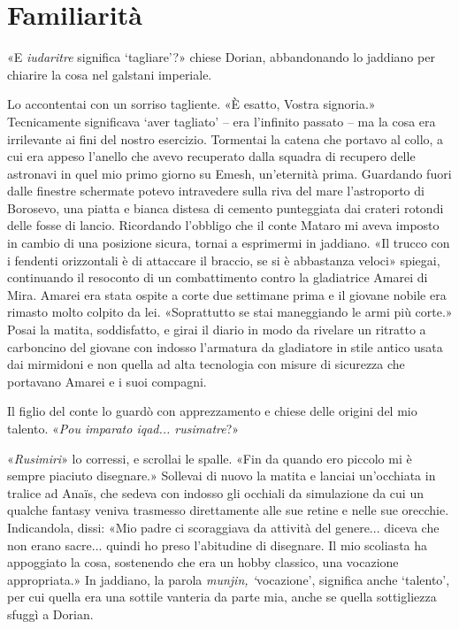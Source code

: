 \chapter{Familiarità}

«E \emph{iudaritre} significa `tagliare'?» chiese Dorian, abbandonando
lo jaddiano per chiarire la cosa nel galstani imperiale.

Lo accontentai con un sorriso tagliente. «È esatto, Vostra signoria.»
Tecnicamente significava `aver tagliato' -- era l'infinito passato -- ma
la cosa era irrilevante ai fini del nostro esercizio. Tormentai la
catena che portavo al collo, a cui era appeso l'anello che avevo
recuperato dalla squadra di recupero delle astronavi in quel mio primo
giorno su Emesh, un'eternità prima. Guardando fuori dalle finestre
schermate potevo intravedere sulla riva del mare l'astroporto di
Borosevo, una piatta e bianca distesa di cemento punteggiata dai crateri
rotondi delle fosse di lancio. Ricordando l'obbligo che il conte Mataro
mi aveva imposto in cambio di una posizione sicura, tornai a esprimermi
in jaddiano. «Il trucco con i fendenti orizzontali è di attaccare il
braccio, se si è abbastanza veloci» spiegai, continuando il resoconto di
un combattimento contro la gladiatrice Amarei di Mira. Amarei era stata
ospite a corte due settimane prima e il giovane nobile era rimasto molto
colpito da lei. «Soprattutto se stai maneggiando le armi più corte.»
Posai la matita, soddisfatto, e girai il diario in modo da rivelare un
ritratto a carboncino del giovane con indosso l'armatura da gladiatore
in stile antico usata dai mirmidoni e non quella ad alta tecnologia con
misure di sicurezza che portavano Amarei e i suoi compagni.

Il figlio del conte lo guardò con apprezzamento e chiese delle origini
del mio talento. «\emph{Pou imparato iqad... rusimatre}?»

«\emph{Rusimiri}» lo corressi, e scrollai le spalle. «Fin da quando ero
piccolo mi è sempre piaciuto disegnare.» Sollevai di nuovo la matita e
lanciai un'occhiata in tralice ad Anaïs, che sedeva con indosso gli
occhiali da simulazione da cui un qualche fantasy veniva trasmesso
direttamente alle sue retine e nelle sue orecchie. Indicandola, dissi:
«Mio padre ci scoraggiava da attività del genere... diceva che non erano
sacre... quindi ho preso l'abitudine di disegnare. Il mio scoliasta ha
appoggiato la cosa, sostenendo che era un hobby classico, una vocazione
appropriata.» In jaddiano, la parola \emph{munjin, `}vocazione',
significa anche `talento', per cui quella era una sottile vanteria da
parte mia, anche se quella sottigliezza sfuggì a Dorian.

